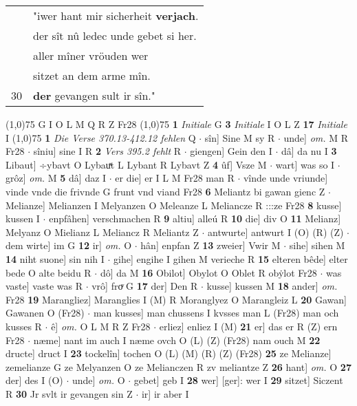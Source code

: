 \documentclass[8pt,a4paper,notitlepage]{article}
\begin{document}
\begin{table}[ht]
\begin{minipage}[t]{0.5\linewidth}
\begin{tabular}{rl}
 & "iwer hant mir sicherheit \textbf{verjach}.\\ 
 & der sît nû ledec unde gebet si her.\\ 
 & aller mîner vröuden wer\\ 
 & sitzet an dem arme mîn.\\ 
30 & \textbf{der} gevangen sult ir sîn."\\ 
\end{tabular}
\scriptsize
\line(1,0){75} \newline
G I O L M Q R Z Fr28 \newline
\line(1,0){75} \newline
\textbf{1} \textit{Initiale} G  \textbf{3} \textit{Initiale} I O L Z  \textbf{17} \textit{Initiale} I  \newline
\line(1,0){75} \newline
\textbf{1} \textit{Die Verse 370.13-412.12 fehlen} Q   $\cdot$ sîn] Sine M sy R  $\cdot$ unde] \textit{om.} M R Fr28  $\cdot$ sîniu] sine I R \textbf{2} \textit{Vers 395.2 fehlt} R   $\cdot$ giengen] Gein den I  $\cdot$ dâ] da nu I \textbf{3} Libaut] ÷ybavt O Lybauͯt L Lybant R Lybavt Z \textbf{4} ûf] Vsze M  $\cdot$ wart] was so I  $\cdot$ grôz] \textit{om.} M \textbf{5} dâ] daz I  $\cdot$ er die] er I L M Fr28 man R  $\cdot$ vînde unde vriunde] vinde vnde die frivnde G frunt vnd viand Fr28 \textbf{6} Meliantz bi gawan gienc Z  $\cdot$ Melianze] Melianzen I Melyanzen O Meleanze L Meliancze R :::ze Fr28 \textbf{8} kusse] kussen I  $\cdot$ enpfâhen] verschmachen R \textbf{9} altiu] alleú R \textbf{10} die] div O \textbf{11} Melianz] Melyanz O Mielianz L Meliancz R Meliantz Z  $\cdot$ antwurte] antwurt I (O) (R) (Z)  $\cdot$ dem wirte] im G \textbf{12} ir] \textit{om.} O  $\cdot$ hân] enpfan Z \textbf{13} zweier] Vwir M  $\cdot$ sihe] sihen M \textbf{14} niht suone] sin nih I  $\cdot$ gihe] engihe I gihen M verieche R \textbf{15} elteren bêde] elter bede O alte beidu R  $\cdot$ dô] da M \textbf{16} Obilot] Obylot O Oblet R obẏlot Fr28  $\cdot$ was vaste] vaste was R  $\cdot$ vrô] froͮ G \textbf{17} der] Den R  $\cdot$ kusse] kussen M \textbf{18} ander] \textit{om.} Fr28 \textbf{19} Marangliez] Maranglies I (M) R Moranglyez O Marangleiz L \textbf{20} Gawan] Gawanen O (Fr28)  $\cdot$ man kusses] man chussens I kvsses man L (Fr28) man och kusses R  $\cdot$ ê] \textit{om.} O L M R Z Fr28  $\cdot$ erliez] enliez I (M) \textbf{21} er] das er R (Z) ern Fr28  $\cdot$ næme] nant im auch I næme ovch O (L) (Z) (Fr28) nam ouch M \textbf{22} dructe] druct I \textbf{23} tockelîn] tochen O (L) (M) (R) (Z) (Fr28) \textbf{25} ze Melianze] zemelianze G ze Melyanzen O ze Melianczen R zv meliantze Z \textbf{26} hant] \textit{om.} O \textbf{27} der] des I (O)  $\cdot$ unde] \textit{om.} O  $\cdot$ gebet] geb I \textbf{28} wer] [ger]: wer I \textbf{29} sitzet] Siczent R \textbf{30} Jr svlt ir gevangen sin Z  $\cdot$ ir] ir aber I \newline

\end{minipage}
\end{table}
\end{document}
